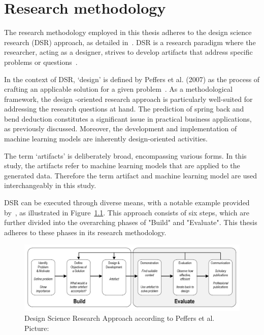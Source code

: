 \chapter{Research methodology}\label{ch:research-methodology}

The research methodology employed in this thesis adheres to the design science research (DSR) approach, as detailed
in~\cite[p. 17]{rennenkampff_managementitagilitaetentwicklung_2015}.
DSR is a research paradigm where the researcher, acting as a designer, strives to develop artifacts that address
specific problems or questions~\cite[p. 10]{hevner_designscienceresearch_2010}.

In the context of DSR, `design' is defined by Peffers et al. (2007) as the process of crafting an applicable solution
for a given problem~\cite[p.47]{peffers_designscienceresearch_2007}.
As a methodological framework, the design -oriented research approach is particularly well-suited for addressing the
research questions at hand.
The prediction of spring back and bend deduction constitutes a significant issue in practical business applications,
as previously discussed.
Moreover, the development and implementation of machine learning models are inherently design-oriented activities.

The term `artifacts' is deliberately broad, encompassing various forms.
In this study, the artifacts refer to machine learning models that are applied to the generated data.
Therefore the term artifact and machine learning model are used interchangeably in this study.

DSR can be executed through diverse means, with a notable example provided by~\cite{peffers_designscienceresearch_2007},
as illustrated in Figure~\ref{fig:dsr_process}.
This approach consists of six steps, which are further divided into the overarching phases of "Build" and "Evaluate".
This thesis adheres to these phases in its research methodology.

\begin{figure}[h]
    \begin{tcolorbox}[arc=0pt,boxrule=0.5pt]
        \centering
        \includegraphics[width=1\linewidth]{chap3/images/dsr_process}
        \caption[DSR Process]{Design Science Research Approach according to Peffers et al.
        Picture:~\cite[p. 72]{sonnenberg_evaluationpatternsdesign_2012}}
        \label{fig:dsr_process}
    \end{tcolorbox}
\end{figure}

